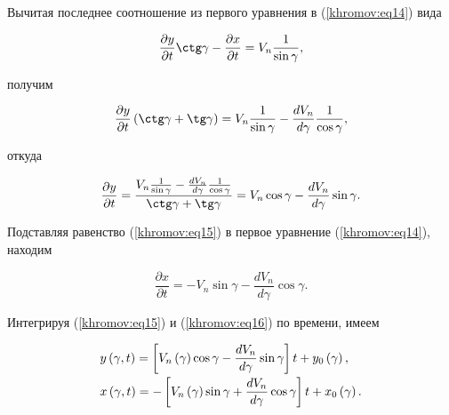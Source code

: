 Вычитая последнее соотношение из первого уравнения в (\ref{khromov:eq14}) вида 

\[

\frac{\partial y}{\partial t}\ctg\gamma - \frac{\partial x}{\partial t} = V_n 

\frac{1}{\sin \gamma },

\]

получим

\[

\frac{\partial y}{\partial t}\left( {\ctg\gamma + \tg\gamma } \right) = V_n 

\frac{1}{\sin \gamma } - \frac{dV_n }{d\gamma }\frac{1}{\cos \gamma },

\]

откуда

\begin{equation}

\label{khromov:eq15}

\frac{\partial y}{\partial t} = \frac{V_n \frac{1}{\sin \gamma } - 

\frac{dV_n }{d\gamma }\frac{1}{\cos \gamma }}{\ctg\gamma + \tg\gamma } = V_n 

\cos \gamma - \frac{dV_n }{d\gamma }\sin \gamma .

\end{equation}







Подставляя равенство (\ref{khromov:eq15}) в первое уравнение (\ref{khromov:eq14}), находим

\begin{equation}

\label{khromov:eq16}

\frac{\partial x}{\partial t} = - V_n \sin \gamma - \frac{dV_n }{d\gamma 

}\cos \gamma .

\end{equation}

Интегрируя (\ref{khromov:eq15}) и (\ref{khromov:eq16}) по времени, имеем

\begin{equation}

\label{khromov:eq17}

\begin{array}{l}

 \displaystyle y\left( {\gamma ,t} \right) = \left[ {V_n \left( \gamma \right)\cos \gamma 

- \frac{dV_n }{d\gamma }\sin \gamma } \right]t + y_0 \left( \gamma \right), \vspace{1mm}

\\ 

 \displaystyle x\left( {\gamma ,t} \right) = - \left[ {V_n \left( \gamma \right)\sin 

\gamma + \frac{dV_n }{d\gamma }\cos \gamma } \right]t + x_0 \left( \gamma 

\right). 

 \end{array}

\end{equation}





